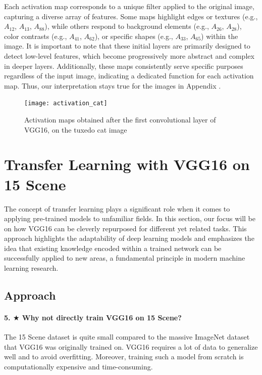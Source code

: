 Each activation map corresponds to a unique filter applied to the original image, capturing a diverse array of features. Some maps highlight edges or textures (e.g., $A_{12}$, $A_{13}$, $A_{88}$), while others respond to background elements (e.g., $A_{26}$, $A_{28}$), color contrasts (e.g., $A_{41}$, $A_{62}$), or specific shapes (e.g., $A_{33}$, $A_{65}$) within the image. It is important to note that these initial layers are primarily designed to detect low-level features, which become progressively more abstract and complex in deeper layers. Additionally, these maps consistently serve specific purposes regardless of the input image, indicating a dedicated function for each activation map. Thus, our interpretation stays true for the images in Appendix .

\begin{figure}[H]
    \centering
    \texttt{[image: activation\_cat]}
    \caption{Activation maps obtained after the first convolutional layer of VGG16, on the tuxedo cat image}
    \label{fig:activation_cat}
\end{figure}

\section{Transfer Learning with VGG16 on 15 Scene}

The concept of transfer learning plays a significant role when it comes to applying pre-trained models to unfamiliar fields. In this section, our focus will be on how VGG16 can be cleverly repurposed for different yet related tasks. This approach highlights the adaptability of deep learning models and emphasizes the idea that existing knowledge encoded within a trained network can be successfully applied to new areas, a fundamental principle in modern machine learning research.

\subsection{Approach}
\paragraph{5. $\bigstar$ Why not directly train VGG16 on 15 Scene?}
The 15 Scene dataset is quite small compared to the massive ImageNet dataset that VGG16 was originally trained on. VGG16 requires a lot of data to generalize well and to avoid overfitting. Moreover, training such a model from scratch is computationally expensive and time-consuming.

